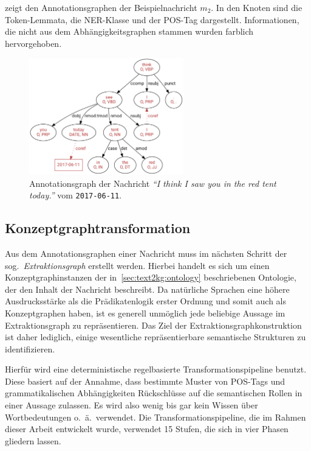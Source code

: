  zeigt den Annotationsgraphen der Beispielnachricht $m_2$.
In den Knoten sind die Token-Lemmata, die NER-Klasse und der POS-Tag dargestellt.
Informationen, die nicht aus dem Abhängigkeitsgraphen stammen wurden farblich hervorgehoben.
\begin{figure}[h]
	\centering
	\includegraphics[width=0.6\textwidth]{gfx/text2kg/annotationGraph1.pdf}
	\caption{Annotationsgraph der Nachricht \textit{``I think I saw you in the red tent today.''} vom \texttt{2017-06-11}.}\label{fig:text2kg:annotationGraph1} %
\end{figure}

\subsection{Konzeptgraphtransformation}%
\label{sec:text2kg:nlp:transform}

Aus dem Annotationsgraphen einer Nachricht muss im nächsten Schritt der sog.\ \textit{Extraktionsgraph} erstellt werden.
Hierbei handelt es sich um einen Konzeptgraphinstanzen der in~\ref{sec:text2kg:ontology} beschriebenen Ontologie, der den Inhalt der Nachricht beschreibt.
Da natürliche Sprachen eine höhere Ausdrucksstärke als die Prädikatenlogik erster Ordnung und somit auch als Konzeptgraphen haben, ist es generell unmöglich jede beliebige Aussage im Extraktionsgraph zu repräsentieren.
Das Ziel der Extraktionsgraphkonstruktion ist daher lediglich, einige wesentliche repräsentierbare semantische Strukturen zu identifizieren.

Hierfür wird eine deterministische regelbasierte Transformationspipeline benutzt.
Diese basiert auf der Annahme, dass bestimmte Muster von POS-Tags und grammatikalischen Abhängigkeiten Rückschlüsse auf die semantischen Rollen in einer Aussage zulassen.
Es wird also wenig bis gar kein Wissen über Wortbedeutungen o.~ä.\ verwendet.
Die Transformationspipeline, die im Rahmen dieser Arbeit entwickelt wurde, verwendet 15 Stufen, die sich in vier Phasen gliedern lassen.

